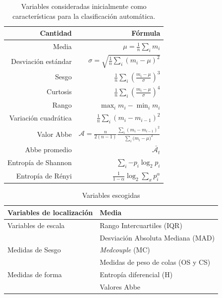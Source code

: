 \documentclass[letterpaper,12pt]{book}
\begin{document}
\begin{table}[ht]
  \centering
  \begin{tabular}{rr}
    \hline
    Cantidad & Fórmula  \\
    \hline
    Media& $\mu =\frac{1}{n}\sum_{i} m_{i}$ \\ 
    Desviación estándar& $\sigma = \sqrt{\frac{1}{n}\sum_{i} (m_{i}-\mu)^{2}}$ \\
    Sesgo & $\frac{1}{n}\sum_{i}{\left(\frac{m_{i}-\mu}{\sigma}\right)^{3}}$ \\
    Curtosis& $\frac{1}{n}\sum_{i}{\left(\frac{m_{i}-\mu}{\sigma}\right)^{4}}$ \\
    Rango& $\max_{i}m_{i} - \min_{i}m_{i}$ \\
    Variación cuadrática& $\frac{1}{n}\sum_{i}(m_{i}-m_{i-1})^{2}$ \\
    Valor Abbe \cite{mowlavi_searching_2014}& $\mathcal{A}=\frac{n}{2(n-1)}\frac{\sum_{i}{(m_{i}-m_{i-1})^{2}}}{\sum_{i}{(m_{i}-\mu})^2}$ \\
    Abbe promedio \cite{mowlavi_searching_2014}& $\bar{\mathcal{A}_{t}}$ \\
    Entropía de Shannon \cite{shannon_mathematical_1948} & $\sum_{i}{-p_{i}\log_{2}{p_{i}}}$ \\
    Entropía de Rényi\cite{renyi_measures_1961}& $\frac{1}{1-\alpha}\log_{2}{\sum_{x}p_{i}^{\alpha}}$\\
    \hline
  \end{tabular}
  \caption{Variables consideradas inicialmente como características para la clasificación automática. }
  \label{cuadro:variablesUtilizadas1}
\end{table}

\begin{table}
  \centering
  \begin{tabular}{ll}
    \hline
    Variables de localización & Media \\
    \hline
    Variables de escala & Rango Intercuartiles (IQR) \\
    & Desviación Absoluta Mediana (MAD) \\
    Medidas de Sesgo & \textit{Medcouple}  (MC)\\
    & Medidas de peso de colas (OS y CS) \\
    Medidas de forma & Entropía diferencial (H)\\
    & Valores Abbe\\
  \end{tabular}
  \caption{Variables escogidas}
  \label{cuadro:variablesUtilizadas2}
\end{table}
\end{document}
